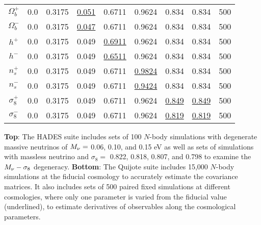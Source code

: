 \begin{table}
\begin{center}
\begin{tabular}{ccccccccc}
    $\Omega_b^+$    & 0.0   & 0.3175 & \underline{0.051} & 0.6711 & 0.9624 & 0.834 & 0.834 & 500 \\ 
    $\Omega_b^-$    & 0.0   & 0.3175 & \underline{0.047} & 0.6711 & 0.9624 & 0.834 & 0.834 & 500 \\ 
    $h^+$           & 0.0   & 0.3175 & 0.049 & \underline{0.6911} & 0.9624 & 0.834 & 0.834 & 500 \\ 
    $h^-$           & 0.0   & 0.3175 & 0.049 & \underline{0.6511} & 0.9624 & 0.834 & 0.834 & 500 \\ 
    $n_s^+$         & 0.0   & 0.3175 & 0.049 & 0.6711 & \underline{0.9824} & 0.834 & 0.834 & 500 \\ 
    $n_s^-$         & 0.0   & 0.3175 & 0.049 & 0.6711 & \underline{0.9424} & 0.834 & 0.834 & 500 \\ 
    $\sigma_8^+$    & 0.0   & 0.3175 & 0.049 & 0.6711 & 0.9624 & \underline{0.849} & \underline{0.849} & 500 \\ 
    $\sigma_8^-$    & 0.0   & 0.3175 & 0.049 & 0.6711 & 0.9624 & \underline{0.819} & \underline{0.819} & 500 \\[3pt]
    \hline
\end{tabular} \label{tab:sims}
\end{center}
    {\bf Top}: The HADES suite includes sets of 100 $N$-body simulations with degenerate massive neutrinos 
    of $M_\nu = $ 0.06, 0.10, and 0.15 eV as well as sets of simulations with massless neutrino and 
    $\sigma_8 = $ 0.822, 0.818, 0.807, and 0.798 to examine the $M_\nu-\sigma_8$ degeneracy. 
    {\bf Bottom}: The Quijote suite includes 15,000 $N$-body simulations at the fiducial cosmology 
    to accurately estimate the covariance matrices. It also includes sets of 500 paired fixed simulations 
    at different cosmologies, where only one parameter is varied from the fiducial value (underlined), 
    to estimate derivatives of observables along the cosmological parameters.
\end{table}
